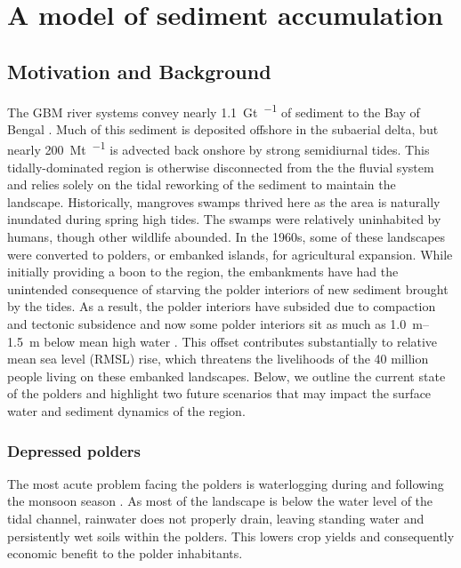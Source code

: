 \documentclass[12pt]{article}
\begin{document}
\section{A model of sediment accumulation}

\subsection{Motivation and Background}

The GBM river systems convey nearly \SI{1.1}{\giga\tonne\per\year} of sediment to the Bay of Bengal \cite{millimanGeomorphicTectonicControl1992}. Much of this sediment is deposited offshore in the subaerial delta, but nearly \SI{200}{\mega\tonne\per\year} is advected back onshore by strong semidiurnal tides. This tidally-dominated region is otherwise disconnected from the the fluvial system and relies solely on the tidal reworking of the sediment to maintain the landscape. Historically, mangroves swamps thrived here as the area is naturally inundated during spring high tides. The swamps were relatively uninhabited by humans, though other wildlife abounded. In the 1960s, some of these landscapes were converted to polders, or embanked islands, for agricultural expansion. While initially providing a boon to the region, the embankments have had the unintended consequence of starving the polder interiors of new sediment brought by the tides. As a result, the polder interiors have subsided due to compaction and tectonic subsidence and now some polder interiors sit as much as \SIrange{1.0}{1.5}{\meter} below mean high water \cite{auerbachFloodRiskNatural2015}. This offset contributes substantially to relative mean sea level (RMSL) rise, which threatens the livelihoods of the 40 million people living on these embanked landscapes. Below, we outline the current state of the polders and highlight two future scenarios that may impact the surface water and sediment dynamics of the region.

\subsubsection*{Depressed polders}

The most acute problem facing the polders is waterlogging during and following the monsoon season \cite{khadimIntegratedWaterResources2013a}. As most of the landscape is below the water level of the tidal channel, rainwater does not properly drain, leaving standing water and persistently wet soils within the polders. This lowers crop yields and consequently economic benefit to the polder inhabitants.
\end{document}
